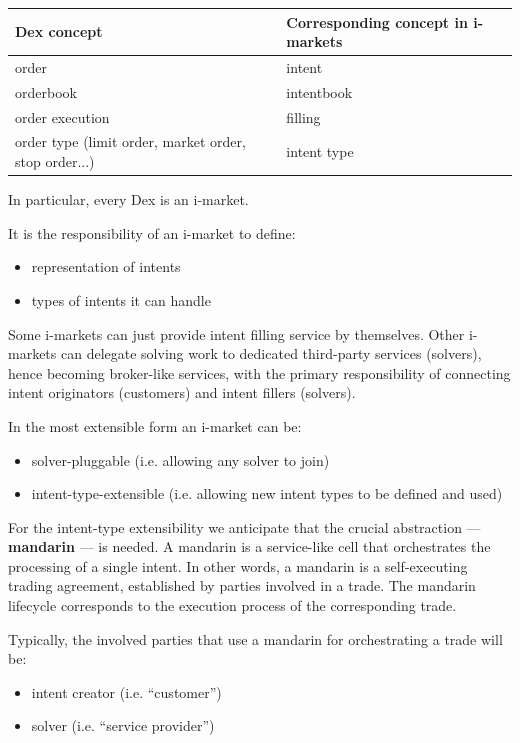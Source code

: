 \documentclass[a4paper]{article}
\begin{document}
\bigskip
\begin{tabularx}{\textwidth}{|l|X|}
\hline
\textbf{Dex concept} & \textbf{Corresponding concept in i-markets} \\
\hline
order & intent \\
\hline
orderbook & intentbook \\
\hline
order execution & filling \\
\hline
order type (limit order, market order, stop order...) & intent type \\
\hline
\end{tabularx}
\bigskip

In particular, every Dex is an i-market.

It is the responsibility of an i-market to define:

\begin{itemize}
  \item representation of intents
  \item types of intents it can handle
\end{itemize}

Some i-markets can just provide intent filling service by themselves. Other i-markets can delegate solving work to dedicated third-party services (solvers), hence becoming broker-like services, with the primary responsibility of connecting intent originators (customers) and intent fillers (solvers).

In the most extensible form an i-market can be:

\begin{itemize}
  \item solver-pluggable (i.e. allowing any solver to join)
  \item intent-type-extensible (i.e. allowing new intent types to be defined and used)
\end{itemize}

For the intent-type extensibility we anticipate that the crucial abstraction --- \textbf{mandarin} --- is needed. A mandarin is a service-like cell that orchestrates the processing of a single intent. In other words, a mandarin is a self-executing trading agreement, established by parties involved in a trade. The mandarin lifecycle corresponds to the execution process of the corresponding trade.

Typically, the involved parties that use a mandarin for orchestrating a trade will be:

\begin{itemize}
  \item intent creator (i.e. ``customer'')
  \item solver (i.e. ``service provider'')
\end{itemize}
\end{document}
